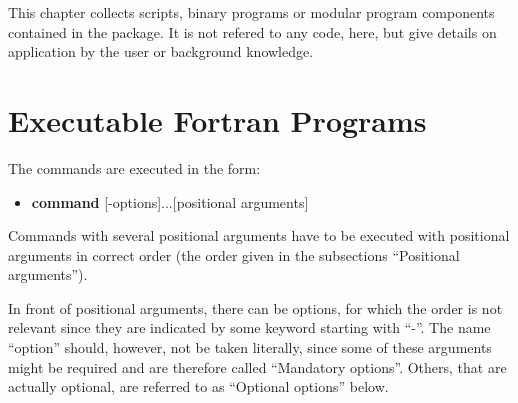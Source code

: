 
%
%
%

This chapter collects scripts, binary programs or modular program components contained 
in the \ASKI{} package. It is not refered to any code, here, but give details on application
by the user or background knowledge.
%
\section{Executable Fortran Programs} \label{programs_scripts,sec:bin_prog}
%
The commands are executed in the form:
\begin{itemize}
\item[]{\bf command} [-options]...[positional arguments]
\end{itemize}
Commands with several positional arguments have to be executed with positional arguments in correct 
order (the order given in the subsections ``Positional arguments'').

In front of positional arguments, there can be options, for which the order is not relevant
since they are indicated by some keyword starting with ``-''. The name ``option'' should, however,
not be taken literally, since some of these arguments might be required and are therefore
called ``Mandatory options''. Others, that are actually optional, are referred to as ``Optional options''
below.


